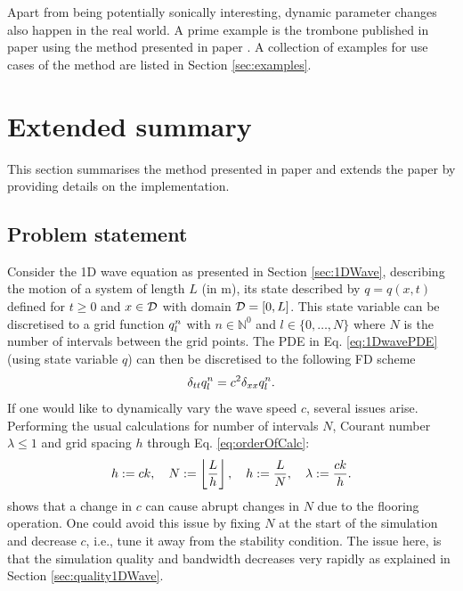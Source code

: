 Apart from being potentially sonically interesting, dynamic parameter changes also happen in the real world. A prime example is the trombone published in paper \citeP[H] using the method presented in paper \citeP[G]. A collection of examples for use cases of the method are listed in Section \ref{sec:examples}.

\section{Extended summary}
This section summarises the method presented in paper \citeP[G] and extends the paper by providing details on the implementation. 

\subsection{Problem statement}
Consider the 1D wave equation  as presented in Section \ref{sec:1DWave}, describing the motion of a system of length $L$ (in m), its state described by $q = q(x,t)$ defined for $t\geq 0$ and $x\in\mathcal{D}$ with domain $\mathcal{D} = [0, L]$. This state variable can be discretised to a grid function $q_l^n$ with $n\in \mathbb{N}^0$ and $l \in \{0, \hdots, N\}$ where $N$ is the number of intervals between the grid points. The PDE in Eq. \eqref{eq:1DwavePDE} (using state variable $q$) can then be discretised to the following FD scheme
\begin{equation}\label{eq:1DWaveDynamic}
    \delta_{tt} q_l^n = c^2\delta_{xx} q_l^n.
\end{equation}
If one would like to dynamically vary the wave speed $c$, several issues arise. Performing the usual calculations for number of intervals $N$, Courant number $\lambda\leq 1$ and grid spacing $h$ through Eq. \eqref{eq:orderOfCalc}:
\begin{equation}\label{eq:dynamicOrderOfCalc}
    h := ck, \quad N := \floor[\frac{L}{h}], \quad h := \frac{L}{N}, \quad \lambda := \frac{ck}{h}.
\end{equation}
shows that a change in $c$ can cause abrupt changes in $N$ due to the flooring operation. One could avoid this issue by fixing $N$ at the start of the simulation and decrease $c$, i.e., tune it away from the stability condition. The issue here, is that the simulation quality and bandwidth decreases very rapidly as explained in Section \ref{sec:quality1DWave}. 

